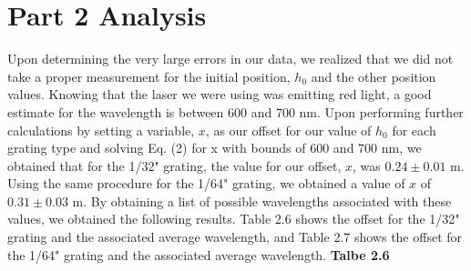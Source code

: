 \documentclass[leqno]{article}
\begin{document}
\section*{Part 2 Analysis}
Upon determining the very large errors in our data, we realized that we did not take a proper measurement for the initial position, $h_0$ and the other position values.  Knowing that the laser we were using was emitting red light, a good estimate for the wavelength is between 600 and 700 nm.  Upon performing further calculations by setting a variable, $x$, as our offset for our value of $h_0$ for each grating type and solving Eq. (2) for x with bounds of 600 and 700 nm, we obtained that for the 1/32" grating, the value for our offset, $x$, was $0.24\pm0.01$ m.  Using the same procedure for the 1/64" grating, we obtained a value of $x$ of $0.31\pm0.03$ m.  By obtaining a list of possible wavelengths associated with these values, we obtained the following results.  Table 2.6 shows the offset for the 1/32" grating and the associated average wavelength, and Table 2.7 shows the offset for the 1/64" grating and the associated average wavelength.
\textbf{Talbe 2.6}\\\\
\begin{tabular}{|c|c|}
\end{tabular}
\end{document}

